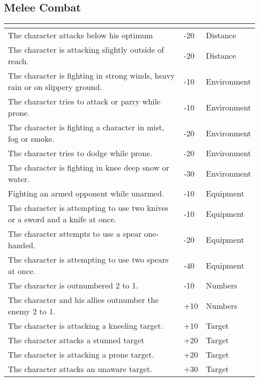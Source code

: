 \documentclass[12pt,a4paper,openany]{book}
\newcommand{\ul}[1]{\underline{\smash{#1}}}
\begin{document}
	\subsection{Melee Combat}
	\begin{tabularx}{\textwidth}{|X|l|l|}
		\hline
		\ul{Situation} & \ul{Modifier} & \ul{Keyword} \\ \hline
		The character attacks below his optimum & -20 & Distance \\ \hline
		The character is attacking slightly outside of reach. & -20 & Distance \\ \hline
		The character is fighting in strong winds, heavy rain or on slippery ground. & -10 & Environment \\ \hline
		The character tries to attack or parry while prone. & -10 & Environment \\ \hline
		The character is fighting a character in mist, fog or smoke. & -20 & Environment \\ \hline
		The character tries to dodge while prone. & -20 & Environment \\ \hline
		The character is fighting in knee deep snow or water. & -30 & Environment \\ \hline
		Fighting an armed opponent while unarmed. & -10 & Equipment \\ \hline
		The character is attempting to use two knives or a sword and a knife at once. & -10 & Equipment \\ \hline
		The character attempts to use a spear one-handed. & -20 & Equipment \\ \hline
		The character is attempting to use two spears at once. & -40 & Equipment \\ \hline
		The character is outnumbered 2 to 1. & -10 & Numbers \\ \hline
		The character and his allies outnumber the enemy 2 to 1. & +10 & Numbers \\ \hline
		The character is attacking a kneeling target. & +10 & Target \\ \hline
		The character attacks a stunned target & +20 & Target \\ \hline
		The character is attacking a prone target. & +20 & Target \\ \hline
		The character attacks an unaware target. & +30 & Target \\ \hline
	\end{tabularx}
\end{document}
